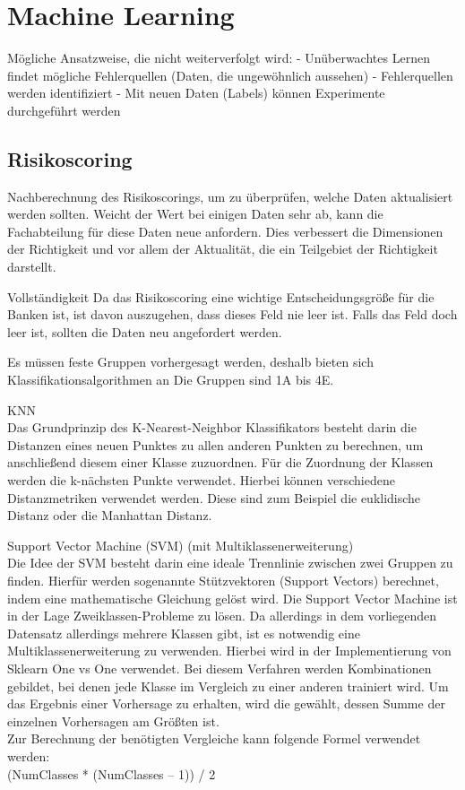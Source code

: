 

\section{Machine Learning}
Mögliche Ansatzweise, die nicht weiterverfolgt wird:
- Unüberwachtes Lernen findet mögliche Fehlerquellen (Daten, die ungewöhnlich aussehen)
- Fehlerquellen werden identifiziert
- Mit neuen Daten (Labels) können Experimente durchgeführt werden 

\subsection{Risikoscoring}
Nachberechnung des Risikoscorings, um zu überprüfen, welche Daten aktualisiert werden sollten.
Weicht der Wert bei einigen Daten sehr ab, kann die Fachabteilung für diese Daten neue anfordern.
Dies verbessert die Dimensionen der Richtigkeit und vor allem der Aktualität, die ein Teilgebiet der Richtigkeit darstellt.

Vollständigkeit
Da das Risikoscoring eine wichtige Entscheidungsgröße für die Banken ist, ist davon auszugehen, dass dieses Feld nie leer ist.
Falls das Feld doch leer ist, sollten die Daten neu angefordert werden. 


Es müssen feste Gruppen vorhergesagt werden, deshalb bieten sich Klassifikationsalgorithmen an
Die Gruppen sind 1A bis 4E. 

KNN \\
Das Grundprinzip des K-Nearest-Neighbor Klassifikators besteht darin die Distanzen eines neuen Punktes zu allen anderen Punkten zu berechnen, um anschließend diesem einer Klasse zuzuordnen.
Für die Zuordnung der Klassen werden die k-nächsten Punkte verwendet.
Hierbei können verschiedene Distanzmetriken verwendet werden. 
Diese sind zum Beispiel die euklidische Distanz oder die Manhattan Distanz.


Support Vector Machine (SVM) (mit Multiklassenerweiterung) \\
Die Idee der SVM besteht darin eine ideale Trennlinie zwischen zwei Gruppen zu finden. 
Hierfür werden sogenannte Stützvektoren (Support Vectors) berechnet, indem eine mathematische Gleichung gelöst wird.
Die Support Vector Machine ist in der Lage Zweiklassen-Probleme zu lösen.
Da allerdings in dem vorliegenden Datensatz allerdings mehrere Klassen gibt, ist es notwendig eine Multiklassenerweiterung zu verwenden.
Hierbei wird in der Implementierung von Sklearn One vs One verwendet. 
Bei diesem Verfahren werden Kombinationen gebildet, bei denen jede Klasse im Vergleich zu einer anderen trainiert wird.
Um das Ergebnis einer Vorhersage zu erhalten, wird die gewählt, dessen Summe der einzelnen Vorhersagen am Größten ist. 
\\ 
Zur Berechnung der benötigten Vergleiche kann folgende Formel verwendet werden:\\
(NumClasses * (NumClasses – 1)) / 2


